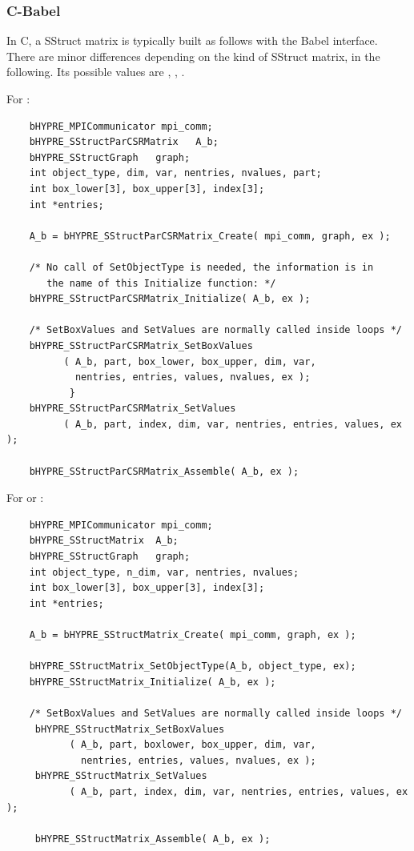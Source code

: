 \subsubsection{C-Babel}

In C, a SStruct  matrix is typically built as follows with
the Babel interface.  There are minor differences depending on the
kind of SStruct matrix,  in the following.  Its possible
values are , , .

For :
\begin{verbatim}
    bHYPRE_MPICommunicator mpi_comm;
    bHYPRE_SStructParCSRMatrix   A_b;
    bHYPRE_SStructGraph   graph;
    int object_type, dim, var, nentries, nvalues, part;
    int box_lower[3], box_upper[3], index[3];
    int *entries;

    A_b = bHYPRE_SStructParCSRMatrix_Create( mpi_comm, graph, ex );

    /* No call of SetObjectType is needed, the information is in
       the name of this Initialize function: */
    bHYPRE_SStructParCSRMatrix_Initialize( A_b, ex );

    /* SetBoxValues and SetValues are normally called inside loops */
    bHYPRE_SStructParCSRMatrix_SetBoxValues
          ( A_b, part, box_lower, box_upper, dim, var,
            nentries, entries, values, nvalues, ex );
           }
    bHYPRE_SStructParCSRMatrix_SetValues
          ( A_b, part, index, dim, var, nentries, entries, values, ex );

    bHYPRE_SStructParCSRMatrix_Assemble( A_b, ex );
\end{verbatim}


For  or :
\begin{verbatim}
    bHYPRE_MPICommunicator mpi_comm;
    bHYPRE_SStructMatrix  A_b;
    bHYPRE_SStructGraph   graph;
    int object_type, n_dim, var, nentries, nvalues;
    int box_lower[3], box_upper[3], index[3];
    int *entries;

    A_b = bHYPRE_SStructMatrix_Create( mpi_comm, graph, ex );

    bHYPRE_SStructMatrix_SetObjectType(A_b, object_type, ex);
    bHYPRE_SStructMatrix_Initialize( A_b, ex );

    /* SetBoxValues and SetValues are normally called inside loops */
     bHYPRE_SStructMatrix_SetBoxValues
           ( A_b, part, boxlower, box_upper, dim, var,
             nentries, entries, values, nvalues, ex );
     bHYPRE_SStructMatrix_SetValues
           ( A_b, part, index, dim, var, nentries, entries, values, ex );

     bHYPRE_SStructMatrix_Assemble( A_b, ex );
\end{verbatim}

